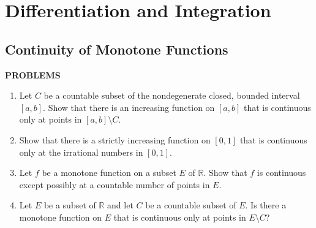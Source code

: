 \chapter{Differentiation and Integration}

\section{Continuity of Monotone Functions}
\begin{center}
	\textbf{PROBLEMS}
\end{center}
\begin{enumerate}
	\setcounter{enumi}{0}
    \item Let $C$ be a countable subset of the nondegenerate closed, bounded interval $[a,b]$. Show that there is an increasing function on $[a,b]$ that is continuous only at points in $[a,b]\setminus C$.
    \item Show that there is a strictly increasing function on $[0,1]$ that is continuous only at the irrational numbers in $[0,1]$.
    \item Let $f$ be a monotone function on a subset $E$ of $\mathbb{R}$. Show that $f$ is continuous except possibly at a countable number of points in $E$.
    \item Let $E$ be a subset of $\mathbb{R}$ and let $C$ be a countable subset of $E$. Is there a monotone function on $E$ that is continuous only at points in $E\setminus C$?
\end{enumerate}

